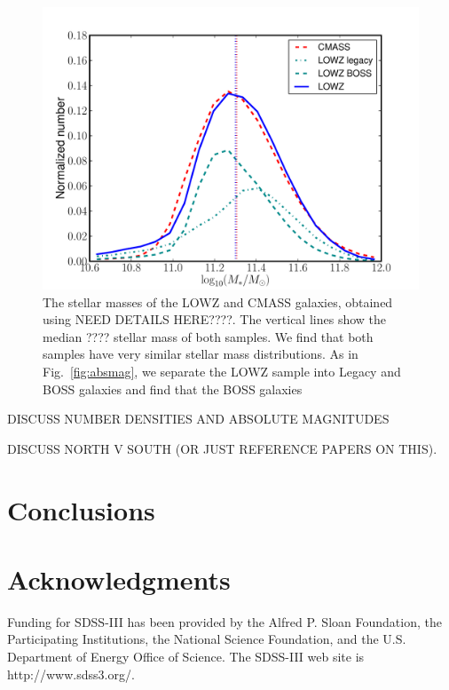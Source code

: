 \documentclass[preprint]{aastex}
\begin{document}
\begin{figure}
\includegraphics[width=0.95\columnwidth]{plots/LOWZ-stellarmass}
\caption{The stellar masses of the LOWZ and CMASS galaxies, obtained using NEED
DETAILS HERE????. The vertical lines show the median ???? stellar mass of both
samples. We find that both samples have very similar stellar mass distributions.
As in Fig.~\ref{fig:absmag}, we separate the LOWZ sample into Legacy and BOSS
galaxies and find that the BOSS galaxies }
\label{fig:stellarmass}
\end{figure}

DISCUSS NUMBER DENSITIES AND ABSOLUTE MAGNITUDES

DISCUSS NORTH V SOUTH (OR JUST REFERENCE PAPERS ON THIS).

\section{Conclusions}


\section{Acknowledgments}

Funding for SDSS-III has been provided by the Alfred P. Sloan
Foundation, the Participating Institutions, the National Science
Foundation, and the U.S. Department of Energy Office of Science. The
SDSS-III web site is http://www.sdss3.org/.
\end{document}
